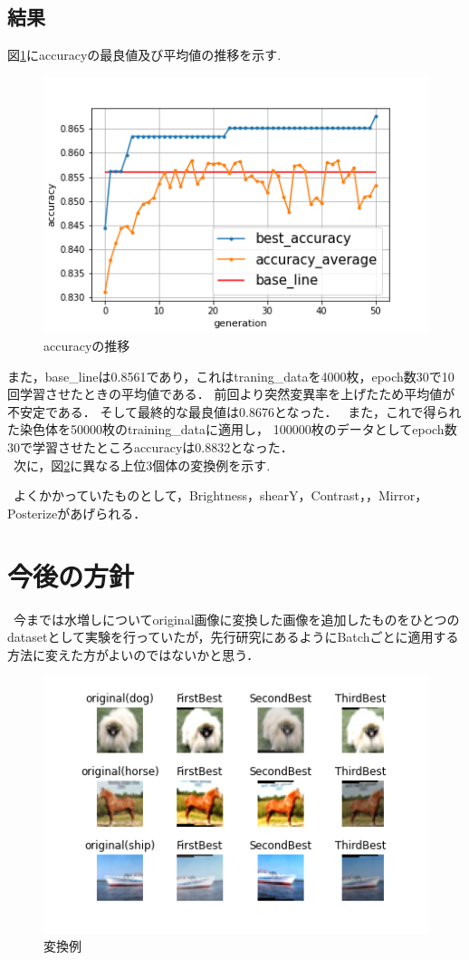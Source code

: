 \documentclass[twocolumn]{jarticle}     %
\begin{document}
\subsection{結果}
図\ref{fig:graph}にaccuracyの最良値及び平均値の推移を示す.
\begin{figure}[hp]
	\centering
	\includegraphics[scale=0.6]{graph.png}
	\caption{accuracyの推移\label{fig:graph}}
\end{figure}

また，base\_lineは0.8561であり，これはtraning\_dataを4000枚，epoch数30で10回学習させたときの平均値である．
前回より突然変異率を上げたため平均値が不安定である．
そして最終的な最良値は0.8676となった．
\ また，これで得られた染色体を50000枚のtraining\_dataに適用し，
100000枚のデータとしてepoch数30で学習させたところaccuracyは0.8832となった．\\
\ 次に，図\ref{fig:TransImg}に異なる上位3個体の変換例を示す.

\ よくかかっていたものとして，Brightness，shearY，Contrast，，Mirror，Posterizeがあげられる．
\section{今後の方針}
\ 今までは水増しについてoriginal画像に変換した画像を追加したものをひとつのdatasetとして実験を行っていたが，先行研究にあるようにBatchごとに適用する方法に変えた方がよいのではないかと思う．


\begin{figure}[h]
	\begin{center}
		\centering
		\includegraphics[scale=0.9]{fig.png}
		\caption{変換例\label{fig:TransImg}}
	\end{center}
\end{figure}
\end{document}
